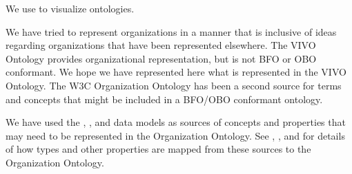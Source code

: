 \documentclass[letterpaper,10pt,english]{sphinxmanual}
\begin{document}
\sphinxAtStartPar
We use   to visualize ontologies.

\sphinxAtStartPar
We have tried to represent organizations in a manner that is inclusive of ideas
regarding organizations that have been represented elsewhere.  The VIVO
Ontology 
provides organizational representation, but is not BFO or OBO conformant.  We
hope we have represented here what is represented in the VIVO Ontology.  The W3C
Organization Ontology  has been a second source for terms and
concepts that might be included in a BFO/OBO conformant ontology.

\sphinxAtStartPar
We have used the , , and  data models as sources of
concepts and properties that may need to be represented in the Organization
Ontology.  See {\hyperref[\detokenize{vivo-to-org::doc}]{}}, {\hyperref[\detokenize{ror-to-org::doc}]{}}, and {\hyperref[\detokenize{schema-to-org::doc}]{}} for
details of how
types and other properties are mapped from these sources to the Organization Ontology.
\end{document}
